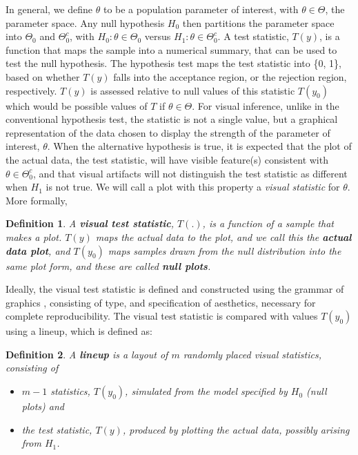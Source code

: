 \documentclass{article}
\newtheorem{dfn}{Definition}[section]
\begin{document}
In general, we define $\theta$ to be a population parameter of interest, with $\theta \in \Theta$, the parameter space. Any null hypothesis $H_0$ then partitions the parameter space into $\Theta_0$ and $\Theta_0^c$, with $H_0: \theta \in \Theta_0$ versus $H_1: \theta \in \Theta_0^c$. A test statistic, $T(y)$, is a function that maps the sample into a numerical summary, that can be used to test the null hypothesis. The hypothesis test maps the test statistic into \{0, 1\}, based on whether $T(y)$ falls into the acceptance region, or the rejection region, respectively. $T(y)$ is assessed relative to null values of this statistic $T(y_0)$ which would be possible values of $T$ if $\theta \in \Theta$.  %
For visual inference, unlike in the conventional hypothesis test, the statistic is not a single value, but a graphical representation of the data chosen to display the strength of the parameter of interest, $\theta$. When the alternative hypothesis is true, it is expected that the plot of the actual data, the test statistic, will have visible feature(s) consistent with $\theta \in \Theta_0^c$, and that visual artifacts will not distinguish the test statistic as different when $H_1$ is not true. We will call a plot with this property a {\it visual statistic} for $\theta$. More formally, 

\begin{dfn} \label{dfn:test}
A \textbf{visual test statistic}, $T(.)$, is a function of a sample that makes a plot. $T(y)$ maps the actual data to the plot, and we call this the \textbf{actual data plot}, and $T(y_0)$ maps samples drawn from the null distribution into the same plot form, and these are called \textbf{null plots}. 
\end{dfn}

\noindent Ideally, the visual test statistic is defined and constructed using the grammar of graphics \citep{wilkinson:1999,hadley:2009}, consisting of type, and specification of aesthetics, necessary for complete reproducibility. The visual test statistic is compared with values $T(y_0)$ using a lineup, which is defined as:

\begin{dfn}\label{dfn:lplot}
A \textbf{lineup} is a layout of $m$ randomly placed visual statistics, consisting of 
\begin{itemize}\itemsep-3pt
\item $m-1$ statistics, $T(y_0)$, simulated from the model specified by $H_0$  (null plots) and 
\item the test statistic, $T(y)$, produced by plotting the actual data, possibly arising from $H_1$.
\end{itemize}
\end{dfn}
\end{document}
